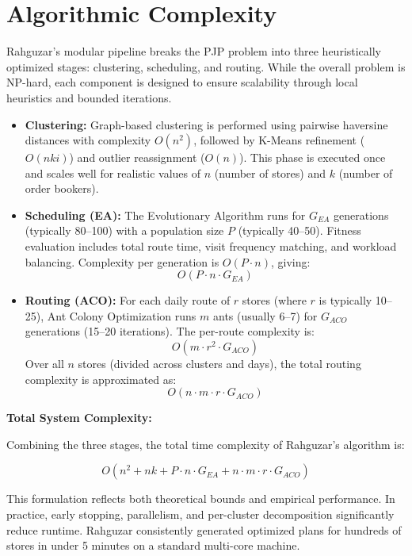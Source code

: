 
\section{Algorithmic Complexity}

Rahguzar’s modular pipeline breaks the PJP problem into three heuristically optimized stages: clustering, scheduling, and routing. While the overall problem is NP-hard, each component is designed to ensure scalability through local heuristics and bounded iterations.

\begin{itemize}
  \item \textbf{Clustering:} Graph-based clustering is performed using pairwise haversine distances with complexity $O(n^2)$, followed by K-Means refinement ($O(nki)$) and outlier reassignment ($O(n)$). This phase is executed once and scales well for realistic values of $n$ (number of stores) and $k$ (number of order bookers).

  \item \textbf{Scheduling (EA):} The Evolutionary Algorithm runs for $G_{EA}$ generations (typically 80–100) with a population size $P$ (typically 40–50). Fitness evaluation includes total route time, visit frequency matching, and workload balancing. Complexity per generation is $O(P \cdot n)$, giving:
  \[
  O(P \cdot n \cdot G_{EA})
  \]

  \item \textbf{Routing (ACO):} For each daily route of $r$ stores (where $r$ is typically 10–25), Ant Colony Optimization runs $m$ ants (usually 6–7) for $G_{ACO}$ generations (15–20 iterations). The per-route complexity is:
  \[
  O(m \cdot r^2 \cdot G_{ACO})
  \]
  Over all $n$ stores (divided across clusters and days), the total routing complexity is approximated as:
  \[
  O(n \cdot m \cdot r \cdot G_{ACO})
  \]
\end{itemize}

\textbf{Total System Complexity:}

Combining the three stages, the total time complexity of Rahguzar’s algorithm is:

\[
O(n^2 + nk + P \cdot n \cdot G_{EA} + n \cdot m \cdot r \cdot G_{ACO})
\]

This formulation reflects both theoretical bounds and empirical performance. In practice, early stopping, parallelism, and per-cluster decomposition significantly reduce runtime. Rahguzar consistently generated optimized plans for hundreds of stores in under 5 minutes on a standard multi-core machine.
